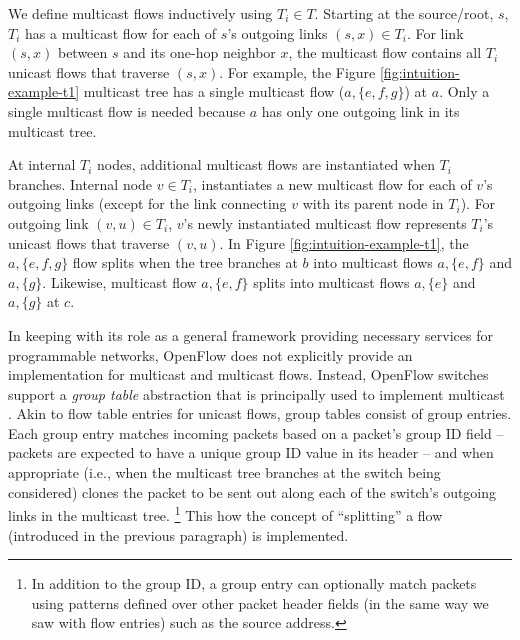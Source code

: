 We define multicast flows inductively using $T_i \in T$.  Starting at the source/root, $s$, $T_i$ has a multicast flow for each of $s$'s outgoing links $(s,x) \in T_i$. 
For link $(s,x)$ between $s$ and its one-hop neighbor $x$, the multicast flow contains all $T_i$ unicast flows that traverse $(s,x)$. %
For example, the Figure \ref{fig:intuition-example-t1} multicast tree has a single multicast flow ($a,\{e,f,g\}$) at $a$.   Only a single multicast flow is needed
because $a$ has only one outgoing link in its multicast tree.   

At internal $T_i$ nodes, additional multicast flows are instantiated when $T_i$ branches.  %
Internal node $v \in T_i$, instantiates a new multicast flow for each of $v$'s outgoing links (except for the link connecting $v$ with its parent node in $T_i$).  For outgoing link $(v,u) \in T_i$, 
$v$'s newly instantiated multicast flow represents $T_i$'s unicast flows that traverse $(v,u)$.  In Figure \ref{fig:intuition-example-t1}, the $a,\{e,f,g\}$ flow 
splits when the tree branches at $b$ into multicast flows $a,\{e,f\}$ and $a,\{g\}$.  Likewise, multicast flow $a,\{e,f\}$ splits into multicast flows $a,\{e\}$ and $a,\{g\}$ at $c$.

In keeping with its role as a general framework providing necessary services for programmable networks, OpenFlow does not explicitly provide an implementation for multicast and multicast flows.
Instead, OpenFlow switches support a \emph{group table} abstraction that is principally used to implement multicast \cite{OpenFlowSpec1.1}. 
Akin to flow table entries for unicast flows, group tables consist of group entries. Each group entry matches incoming packets based on a packet's group ID field
-- packets are expected to have a unique group ID value in its header -- and when appropriate (i.e., when the multicast tree branches at the switch being considered) 
clones the packet to be sent out along each of the switch's outgoing links in the multicast tree. 
\footnote{In addition to the group ID, a group entry can optionally match packets using patterns defined over other packet header fields (in the same way we saw with flow entries) such as the source address.} 
This how the concept of ``splitting''  a flow (introduced in the previous paragraph) is implemented.

